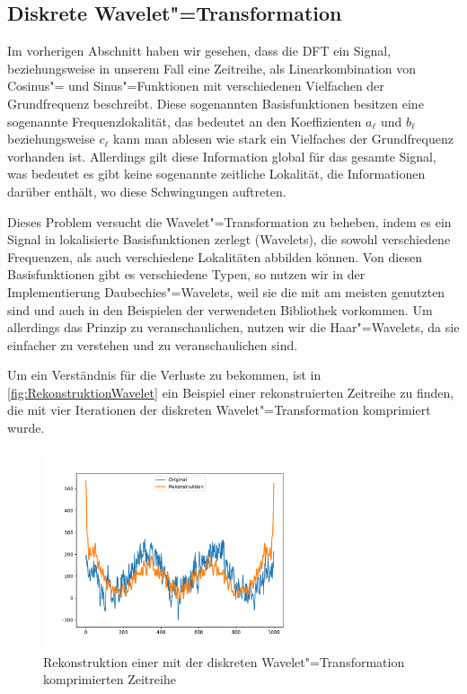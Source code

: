 \subsection{Diskrete Wavelet"=Transformation}
Im vorherigen Abschnitt haben wir gesehen, dass die \acs{DFT} ein Signal, beziehungsweise in unserem Fall eine Zeitreihe, als Linearkombination von Cosinus"= und Sinus"=Funktionen mit verschiedenen Vielfachen der Grundfrequenz beschreibt. Diese sogenannten Basisfunktionen besitzen eine sogenannte Frequenzlokalität, das bedeutet an den Koeffizienten $a_\ell$ und $b_\ell$ beziehungsweise $c_\ell$ kann man ablesen wie stark ein Vielfaches der Grundfrequenz vorhanden ist. Allerdings gilt diese Information global für das gesamte Signal, was bedeutet es gibt keine sogenannte zeitliche Lokalität, die Informationen darüber enthält, wo diese Schwingungen auftreten.

Dieses Problem versucht die Wavelet"=Transformation zu beheben, indem es ein Signal in lokalisierte Basisfunktionen zerlegt (Wavelets), die sowohl verschiedene Frequenzen, als auch verschiedene Lokalitäten abbilden können. Von diesen Basisfunktionen gibt es verschiedene Typen, so nutzen wir in der Implementierung Daubechies"=Wavelets, weil sie die mit am meisten genutzten sind und auch in den Beispielen der verwendeten Bibliothek vorkommen. Um allerdings das Prinzip zu veranschaulichen, nutzen wir die Haar"=Wavelets, da sie einfacher zu verstehen und zu veranschaulichen sind.

\bigskip
   
\noindent%
%
\hfill%
%
\hfill%
%
\hfill%
%

Um ein Verständnis für die Verluste zu bekommen, ist in \autoref{fig:RekonstruktionWavelet} ein Beispiel einer rekonstruierten Zeitreihe zu finden, die mit vier Iterationen der diskreten Wavelet"=Transformation komprimiert wurde.
\begin{figure}[bth] 
  \centering
  \includegraphics[width=0.7\textwidth]{Graphics/RekonstruktionFourier.pdf}
  \caption{Rekonstruktion einer mit der diskreten Wavelet"=Transformation komprimierten Zeitreihe}
  \label{fig:RekonstruktionWavelet}
\end{figure}